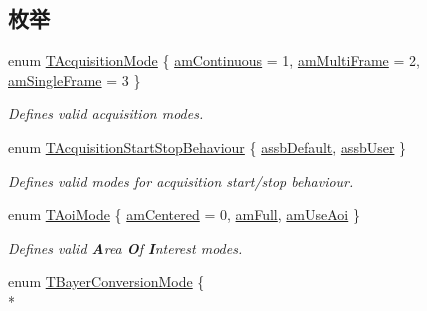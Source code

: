 \subsection*{枚举}
\begin{DoxyCompactItemize}
\item 
enum \hyperlink{group___common_interface_ga712e943ac923bb84ce2f83a57b20e6b1}{T\+Acquisition\+Mode} \{ \hyperlink{group___common_interface_gga712e943ac923bb84ce2f83a57b20e6b1a5de3022fd653b96d9ac5f47e8b0c0e9b}{am\+Continuous} = 1, 
\hyperlink{group___common_interface_gga712e943ac923bb84ce2f83a57b20e6b1a268f20a55d039cf7657485513e68922a}{am\+Multi\+Frame} = 2, 
\hyperlink{group___common_interface_gga712e943ac923bb84ce2f83a57b20e6b1a2c6590adb341529c735d75ff5c48b8ff}{am\+Single\+Frame} = 3
 \}
\begin{DoxyCompactList}\small\item\em Defines valid acquisition modes. \end{DoxyCompactList}\item 
enum \hyperlink{group___common_interface_ga5c60e3239df59a2d82b529ebc7ed13f5}{T\+Acquisition\+Start\+Stop\+Behaviour} \{ \hyperlink{group___common_interface_gga5c60e3239df59a2d82b529ebc7ed13f5a26b25f4c47d6a2e2c852499fbfdc8514}{assb\+Default}, 
\hyperlink{group___common_interface_gga5c60e3239df59a2d82b529ebc7ed13f5aa7ee6255187e04caeec5760498086e02}{assb\+User}
 \}
\begin{DoxyCompactList}\small\item\em Defines valid modes for acquisition start/stop behaviour. \end{DoxyCompactList}\item 
enum \hyperlink{group___common_interface_gae7940d967323243f7d4ebdb5cc8045cb}{T\+Aoi\+Mode} \{ \hyperlink{group___common_interface_ggae7940d967323243f7d4ebdb5cc8045cbae9642ac2013fd67c8a0bd7a6bc59c437}{am\+Centered} = 0, 
\hyperlink{group___common_interface_ggae7940d967323243f7d4ebdb5cc8045cba5421f4831311942964431b576460e231}{am\+Full}, 
\hyperlink{group___common_interface_ggae7940d967323243f7d4ebdb5cc8045cba7d283190ce147f8720e13b8f5db30bd4}{am\+Use\+Aoi}
 \}
\begin{DoxyCompactList}\small\item\em Defines valid {\bfseries A}rea {\bfseries O}f {\bfseries I}nterest modes. \end{DoxyCompactList}\item 
enum \hyperlink{group___common_interface_gab19b45fcaaa584be84a99a3d7098b055}{T\+Bayer\+Conversion\+Mode} \{ \\*

\end{DoxyCompactItemize}
